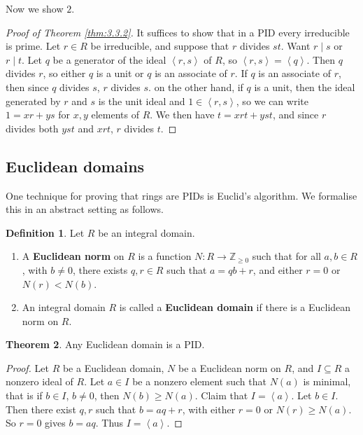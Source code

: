 \documentclass{article}
\newcommand{\Z}{\mathbb{Z}}
\newcommand{\rb}[1]{\left( #1 \right)}
\newcommand{\ab}[1]{\left\langle #1 \right\rangle}
\theoremstyle{definition}\newtheorem{definition}{Definition}[subsection]
\theoremstyle{definition}\newtheorem{remark}[definition]{Remark}
\theoremstyle{definition}\newtheorem*{example}{Example}
\theoremstyle{definition}\newtheorem*{note}{Note}
\newtheorem{theorem}[definition]{Theorem}
\begin{document}
Now we show $ 2 $.

\begin{proof}[Proof of Theorem \ref{thm:3.3.2}]
It suffices to show that in a PID every irreducible is prime. Let $ r \in R $ be irreducible, and suppose that $ r $ divides $ st $. Want $ r \mid s $ or $ r \mid t $. Let $ q $ be a generator of the ideal $ \ab{r, s} $ of $ R $, so $ \ab{r, s} = \ab{q} $. Then $ q $ divides $ r $, so either $ q $ is a unit or $ q $ is an associate of $ r $. If $ q $ is an associate of $ r $, then since $ q $ divides $ s $, $ r $ divides $ s $. on the other hand, if $ q $ is a unit, then the ideal generated by $ r $ and $ s $ is the unit ideal and $ 1 \in \ab{r, s} $, so we can write $ 1 = xr + ys $ for $ x, y $ elements of $ R $. We then have $ t = xrt + yst $, and since $ r $ divides both $ yst $ and $ xrt $, $ r $ divides $ t $.
\end{proof}


\subsection{Euclidean domains}

One technique for proving that rings are PIDs is Euclid's algorithm. We formalise this in an abstract setting as follows.

\begin{definition}
Let $ R $ be an integral domain.
\begin{enumerate}
\item A \textbf{Euclidean norm} on $ R $ is a function $ N : R \to \Z_{\ge 0} $ such that for all $ a, b \in R $, with $ b \ne 0 $, there exists $ q, r \in R $ such that $ a = qb + r $, and either $ r = 0 $ or $ N\rb{r} < N\rb{b} $.
\item An integral domain $ R $ is called a \textbf{Euclidean domain} if there is a Euclidean norm on $ R $.
\end{enumerate}
\end{definition}

\begin{theorem}
Any Euclidean domain is a PID.
\end{theorem}

\begin{proof}
Let $ R $ be a Euclidean domain, $ N $ be a Euclidean norm on $ R $, and $ I \subseteq R $ a nonzero ideal of $ R $. Let $ a \in I $ be a nonzero element such that $ N\rb{a} $ is minimal, that is if $ b \in I $, $ b \ne 0 $, then $ N\rb{b} \ge N\rb{a} $. Claim that $ I = \ab{a} $. Let $ b \in I $. Then there exist $ q, r $ such that $ b = aq + r $, with either $ r = 0 $ or $ N\rb{r} \ge N\rb{a} $. So $ r = 0 $ gives $ b = aq $. Thus $ I = \ab{a} $.
\end{proof}
\end{document}
